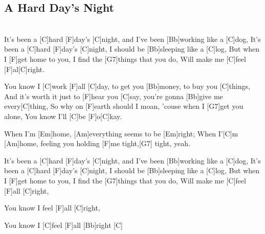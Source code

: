 \subsection{A Hard Day's Night}

\begin{guitar}
\\
It's been a [C]{hard} [F]{day's} [C]{night}, and I've been [Bb]{work}ing like a [C]{dog},
It's been a [C]{hard} [F]{day's} [C]{night}, I should be [Bb]{sleep}ing like a [C]{log},
But when I [F]{get} home to you, I find the [G7]{things} that you do, 
Will make me [C]{feel} [F]{al}[C]{right}.


You know I [C]{work} [F]{all} [C]{day}, to get you [Bb]{mon}ey, to buy you [C]{things},
And it's worth it just to [F]{hear} you [C]{say}, you're gonna [Bb]{give} me every[C]{thing},
So why on [F]{earth} should I moan, 'couse when I [G7]{get} you alone, 
You know I'll [C]{be} [F]{o}[C]{kay}.


When I'm [Em]{home},  [Am]{ev}erything seems to be [Em]{right};
When I'[C]{m} [Am]{home}, feeling you holding [F]{me} tight,[G7]{ }tight, yeah.


It's been a [C]{hard} [F]{day's} [C]{night}, and I've been [Bb]{work}ing like a [C]{dog},
It's been a [C]{hard} [F]{day's} [C]{night}, I should be [Bb]{sleep}ing like a [C]{log},
But when I [F]{get} home to you, I find the [G7]{things} that you do,
Will make me [C]{feel} [F]{all} [C]{right},


You know I feel [F]{all} [C]{right},


You know I [C]{feel} [F]{all} [Bb]{right}      [C]{}

\end{guitar}